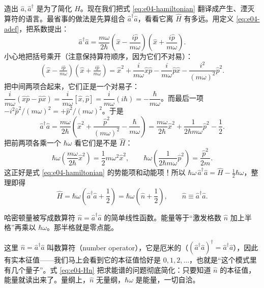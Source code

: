 造出 \(\hat a,\hat a^\dagger\) 是为了简化 \(\hat H\)。现在我们把式 \eqref{eq:e04-hamiltonian} 翻译成产生、湮灭算符的语言。最省事的做法是先算组合 \(\hat a^\dagger\hat a\)，看看它离 \(\hat H\) 有多远。用定义 \eqref{eq:e04-adef}，把系数提出：
\[
  \hat a^\dagger\hat a
  =\frac{m\omega}{2\hbar}
  \left(\hat x-\frac{i\hat p}{m\omega}\right)\!\left(\hat x+\frac{i\hat p}{m\omega}\right).
\]
小心地把括号乘开（注意保持算符顺序，因为它们不对易）：
\[
  \left(\hat x-\tfrac{i\hat p}{m\omega}\right)\!\left(\hat x+\tfrac{i\hat p}{m\omega}\right)
  =\hat x^2+\frac{i}{m\omega}\hat x\hat p-\frac{i}{m\omega}\hat p\hat x-\frac{i^2}{(m\omega)^2}\hat p^2 .
\]
把中间两项合起来，它们正是一个对易子：\(\dfrac{i}{m\omega}(\hat x\hat p-\hat p\hat x)=\dfrac{i}{m\omega}[\hat x,\hat p]=\dfrac{i}{m\omega}(i\hbar)=-\dfrac{\hbar}{m\omega}\)。而最后一项 \(-i^2\hat p^2/(m\omega)^2=+\hat p^2/(m\omega)^2\)。于是
\[
  \hat a^\dagger\hat a
  =\frac{m\omega}{2\hbar}
  \left(\hat x^2+\frac{\hat p^2}{(m\omega)^2}-\frac{\hbar}{m\omega}\right)
  =\frac{m\omega}{2\hbar}\hat x^2+\frac{1}{2\hbar m\omega}\hat p^2-\frac12 .
\]
把前两项各乘一个 \(\hbar\omega\) 看它们是不是 \(\hat H\)：
\[
  \hbar\omega\left(\frac{m\omega}{2\hbar}\hat x^2\right)=\frac12 m\omega^2\hat x^2,
  \qquad
  \hbar\omega\left(\frac{1}{2\hbar m\omega}\hat p^2\right)=\frac{\hat p^2}{2m}.
\]
这正好是式 \eqref{eq:e04-hamiltonian} 的势能项和动能项！所以 \(\hbar\omega\,\hat a^\dagger\hat a=\hat H-\tfrac12\hbar\omega\)，整理即得
\begin{equation}
  \hat H=\hbar\omega\left(\hat a^\dagger\hat a+\frac12\right)
        =\hbar\omega\left(\hat n+\frac12\right),
  \qquad \hat n\equiv\hat a^\dagger\hat a .
  \label{eq:e04-Hn}
\end{equation}
\begin{formulaexplain}
哈密顿量被写成数算符 \(\hat n=\hat a^\dagger\hat a\) 的简单线性函数。能量等于“激发格数 \(\hat n\) 加上半格”再乘以 \(\hbar\omega\)。那半格就是零点能。
\end{formulaexplain}
这里 \(\hat n=\hat a^\dagger\hat a\) 叫数算符（number operator），它是厄米的（\((\hat a^\dagger\hat a)^\dagger=\hat a^\dagger\hat a\)），因此有实本征值——我们马上会看到它的本征值恰好是 \(0,1,2,\ldots\)，也就是“这个模式里有几个量子”。式 \eqref{eq:e04-Hn} 把求能谱的问题彻底简化：只要知道 \(\hat n\) 的本征值，能量就读出来了。量纲上，\(\hat n\) 无量纲，\(\hbar\omega\) 是能量，一切自洽。

